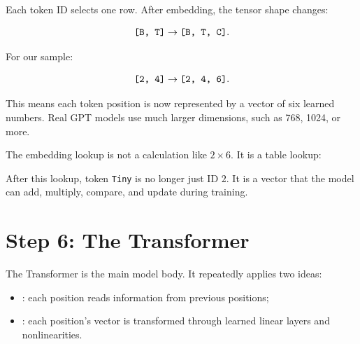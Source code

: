 Each token ID selects one row. After embedding, the tensor shape changes:

\[
\texttt{[B, T]} \rightarrow \texttt{[B, T, C]}.
\]

For our sample:

\[
\texttt{[2, 4]} \rightarrow \texttt{[2, 4, 6]}.
\]

This means each token position is now represented by a vector of six learned numbers. Real GPT models use much larger dimensions, such as 768, 1024, or more.

The embedding lookup is not a calculation like \(2 \times 6\). It is a table lookup:

\begin{center}
\end{center}

After this lookup, token \texttt{Tiny} is no longer just ID \(2\). It is a vector that the model can add, multiply, compare, and update during training.

\section{Step 6: The Transformer}

The Transformer is the main model body. It repeatedly applies two ideas:

\begin{itemize}
  \item {}: each position reads information from previous positions;
  \item {}: each position's vector is transformed through learned linear layers and nonlinearities.
\end{itemize}

